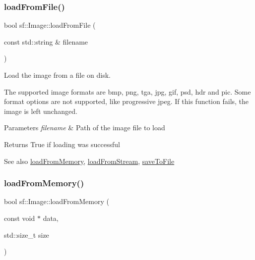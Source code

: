 \subsubsection{\texorpdfstring{loadFromFile()}{loadFromFile()}}
{\footnotesize\ttfamily bool sf\+::\+Image\+::load\+From\+File (\begin{DoxyParamCaption}\item[{const std\+::string \&}]{filename }\end{DoxyParamCaption})}



Load the image from a file on disk. 

The supported image formats are bmp, png, tga, jpg, gif, psd, hdr and pic. Some format options are not supported, like progressive jpeg. If this function fails, the image is left unchanged.


\begin{DoxyParams}{Parameters}
{\em filename} & Path of the image file to load\\
\hline
\end{DoxyParams}
\begin{DoxyReturn}{Returns}
True if loading was successful
\end{DoxyReturn}
\begin{DoxySeeAlso}{See also}
\mbox{\hyperlink{classsf_1_1_image_aaa6c7afa5851a51cec6ab438faa7354c}{load\+From\+Memory}}, \mbox{\hyperlink{classsf_1_1_image_a21122ded0e8368bb06ed3b9acfbfb501}{load\+From\+Stream}}, \mbox{\hyperlink{classsf_1_1_image_a51537fb667f47cbe80395cfd7f9e72a4}{save\+To\+File}} \begin{DoxyVerb}\end{DoxyVerb}
 
\end{DoxySeeAlso}
\mbox{\label{classsf_1_1_image_aaa6c7afa5851a51cec6ab438faa7354c}} 
\subsubsection{\texorpdfstring{loadFromMemory()}{loadFromMemory()}}
{\footnotesize\ttfamily bool sf\+::\+Image\+::load\+From\+Memory (\begin{DoxyParamCaption}\item[{const void $\ast$}]{data,  }\item[{std\+::size\+\_\+t}]{size }\end{DoxyParamCaption})}



